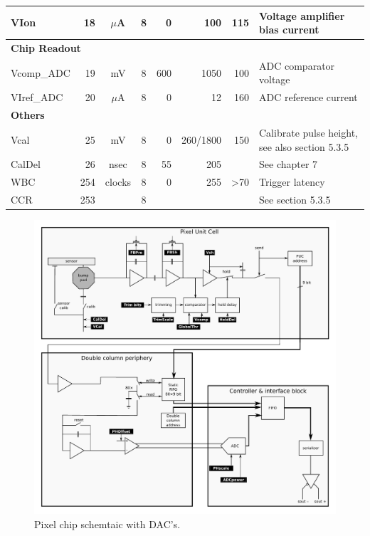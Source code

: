 \begin{table}[h]
\begin{center}
{\begin{tabular}{lrccrrrl}
	VIon        & 18 & $\mu$A  & 8 & 0 & 100 & 115 & Voltage amplifier bias current \\ 
	\midrule
	\multicolumn{ 8}{l}{\textbf{Chip Readout}} \\ 
	Vcomp\_ADC  & 19 & mV & 8  & 600 & 1050 & 100 & ADC comparator voltage \\ 
	VIref\_ADC  & 20 & $\mu$A  & 8 & 0 & 12 & 160 & ADC reference current \\ 
	\midrule
	\multicolumn{ 8}{l}{\textbf{Others}} \\ 
	Vcal        & 25 & mV      & 8 & 0 & 260/1800 & 150 & Calibrate pulse height, see also section 5.3.5 \\ 
	CalDel      & 26 & nsec    & 8 & 55 & 205 &  & See chapter 7 \\ 
	WBC         & 254 & clocks & 8 & 0 & 255 &                 >70 & Trigger latency \\ 
	CCR         & 253 &        & 8 &  &  &  & See section 5.3.5 \\ 
	\bottomrule
	\end{tabular}
	}
    \end{center}
\end{table}

\begin{figure}[hbtp]
	\includegraphics[width=.9\textwidth]{img/ROC_DACschema.pdf}
	\caption{Pixel chip schemtaic with DAC's. }
	\label{fig:ROCDACschematic}
\end{figure}

